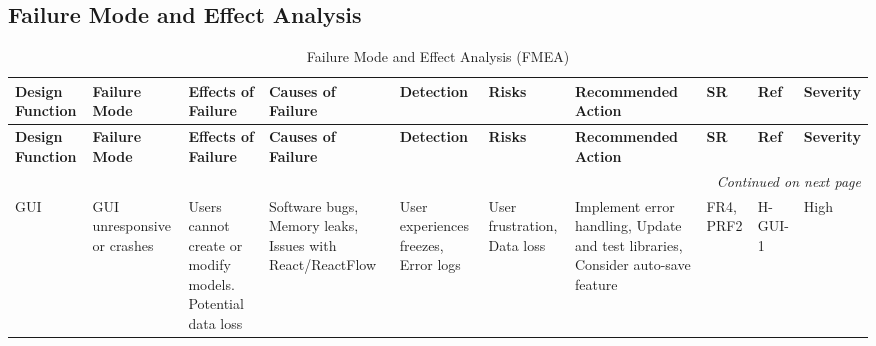 \documentclass{article}
\begin{document}
\begin{landscape}
    \section{Failure Mode and Effect Analysis}

    \begin{longtable}{@{} p{2cm} p{2cm} p{3cm} p{3cm} p{2.5cm} p{2.5cm} p{3.5cm} p{1cm} p{1cm} p{1cm}}
        \caption{Failure Mode and Effect Analysis (FMEA)} \label{tab:FMEA} \\
        \toprule
        \textbf{Design Function} & \textbf{Failure Mode} & \textbf{Effects of Failure} & \textbf{Causes of Failure} & \textbf{Detection} & \textbf{Risks} & \textbf{Recommended Action} & \textbf{SR} & \textbf{Ref} & \textbf{Severity} \\
        \midrule
        \endfirsthead
    
        \toprule
        \textbf{Design Function} & \textbf{Failure Mode} & \textbf{Effects of Failure} & \textbf{Causes of Failure} & \textbf{Detection} & \textbf{Risks} & \textbf{Recommended Action} & \textbf{SR} & \textbf{Ref} & \textbf{Severity} \\
        \midrule
        \endhead
    
        \midrule
        \multicolumn{10}{r}{\textit{Continued on next page}} \\
        \midrule
        \endfoot
    
        \bottomrule
        \endlastfoot
        
        GUI & GUI unresponsive or crashes & Users cannot create or modify models. Potential data loss & Software bugs, Memory leaks, Issues with React/ReactFlow & User experiences freezes, Error logs & User frustration, Data loss & Implement error handling, Update and test libraries, Consider auto-save feature & FR4, PRF2 & H-GUI-1 & High \\
    
        \midrule
        

\end{longtable}
\end{landscape}
\end{document}
